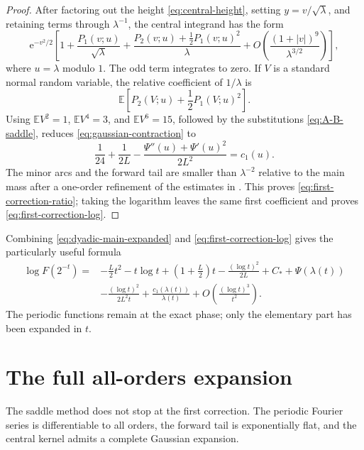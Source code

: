 \documentclass[11pt]{article}
\numberwithin{equation}{section}
\theoremstyle{definition}
\theoremstyle{remark}
\newcommand{\e}{\mathrm{e}}
\begin{document}
\begin{proof}
After factoring out the height \eqref{eq:central-height}, setting
$y=v/\sqrt\lambda$, and retaining terms through $\lambda^{-1}$, the central
integrand has the form
\begin{equation}\label{eq:central-first-expansion}
 \e^{-v^2/2}\left[
 1+\frac{P_1(v;u)}{\sqrt\lambda}
 +\frac{P_2(v;u)+\frac12P_1(v;u)^2}{\lambda}
 +O\left(\frac{(1+|v|)^9}{\lambda^{3/2}}
\right)
 \right],
\end{equation}
where $u=\lambda$ modulo $1$.  The odd term integrates to zero.  If $V$ is a
standard normal random variable, the relative coefficient of $1/\lambda$ is
\begin{equation}\label{eq:gaussian-contraction}
 \mathbb E\left[P_2(V;u)+\frac12P_1(V;u)^2\right].
\end{equation}
Using
$\mathbb EV^2=1$, $\mathbb EV^4=3$, and $\mathbb EV^6=15$, followed by the
substitutions \eqref{eq:A-B-saddle}, reduces
\eqref{eq:gaussian-contraction} to
\[
 \frac1{24}+\frac1{2L}
 -\frac{\Psi''(u)+\Psi'(u)^2}{2L^2}=c_1(u).
\]
The minor arcs and the forward tail are smaller than $\lambda^{-2}$ relative
to the main mass after a one-order refinement of the estimates in
.  This proves \eqref{eq:first-correction-ratio}; taking
the logarithm leaves the same first coefficient and proves
\eqref{eq:first-correction-log}.
\end{proof}

Combining \eqref{eq:dyadic-main-expanded} and
\eqref{eq:first-correction-log} gives the particularly useful formula
\begin{equation}\label{eq:dyadic-first-full}
 \begin{split}
 \log F(2^{-t})={}&-\frac L2t^2-t\log t
 +\left(1+\frac L2\right)t
 -\frac{(\log t)^2}{2L}+C_*+\Psi(\lambda(t))\\
 &-\frac{(\log t)^2}{2L^2t}
 +\frac{c_1(\lambda(t))}{\lambda(t)}
 +O\left(\frac{(\log t)^3}{t^2}\right).
 \end{split}
\end{equation}
The periodic functions remain at the exact phase; only the elementary part
has been expanded in $t$.

\section{The full all-orders expansion}\label{sec:full-expansion}

The saddle method does not stop at the first correction.  The periodic
Fourier series is differentiable to all orders, the forward tail is
exponentially flat, and the central kernel admits a complete Gaussian
expansion.
\end{document}

